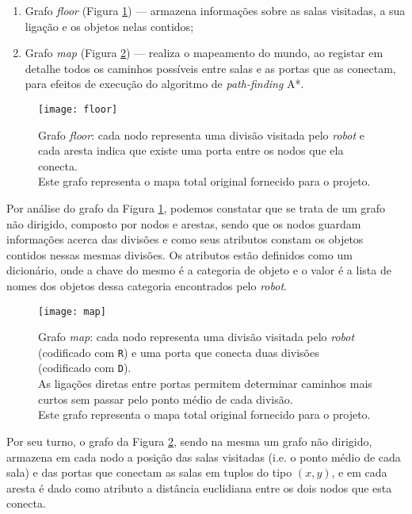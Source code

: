 \begin{enumerate}
	\item Grafo \emph{floor} (Figura \ref{fig::grafo_floor}) --- armazena informações sobre as salas visitadas, a sua ligação e os objetos nelas contidos;
	
	\item Grafo \emph{map} (Figura \ref{fig::grafo_map}) --- realiza o mapeamento do mundo, ao registar em detalhe todos os caminhos possíveis entre salas e as portas que as conectam, para efeitos de execução do algoritmo de \textit{path-finding} A*.
\end{enumerate}

\begin{figure}[!htb]
	\centering
	\texttt{[image: floor]}
	\caption[Grafo \textit{floor}]{Grafo \textit{floor}: cada nodo representa uma divisão visitada pelo \textit{robot} e cada aresta indica que existe uma porta entre os nodos que ela conecta.\\ Este grafo representa o mapa total original fornecido para o projeto.}
	\label{fig::grafo_floor}
\end{figure}

Por análise do grafo da Figura \ref{fig::grafo_floor}, podemos constatar que se trata de um grafo não dirigido, composto por nodos e arestas, sendo que os nodos guardam informações acerca das divisões e como seus atributos constam os objetos contidos nessas mesmas divisões. Os atributos estão definidos como um dicionário, onde a chave do mesmo é a categoria de objeto e o valor é a lista de nomes dos objetos dessa categoria encontrados pelo \emph{robot}.

\begin{figure}[!htb]
	\centering
	\texttt{[image: map]}
	\caption[Grafo \textit{map}]{Grafo \textit{map}: cada nodo representa uma divisão visitada pelo \textit{robot} (codificado com \texttt{R}) e uma porta que conecta duas divisões (codificado com \texttt{D}).\\ As ligações diretas entre portas permitem determinar caminhos mais curtos sem passar pelo ponto médio de cada divisão.\\ Este grafo representa o mapa total original fornecido para o projeto.}
	\label{fig::grafo_map}
\end{figure}

Por seu turno, o grafo da Figura \ref{fig::grafo_map}, sendo na mesma um grafo não dirigido, armazena em cada nodo a posição das salas visitadas (i.e. o ponto médio de cada sala) e das portas que conectam as salas em tuplos do tipo $(x, y)$, e em cada aresta é dado como atributo a distância euclidiana entre os dois nodos que esta conecta.

